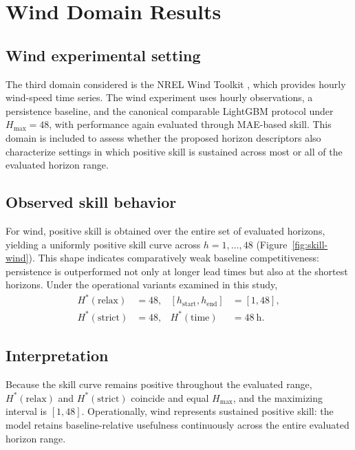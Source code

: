 \documentclass[pdflatex]{sn-jnl}
\begin{document}
\section{Wind Domain Results}

\subsection{Wind experimental setting}

The third domain considered is the NREL Wind Toolkit \citep{draxl2015}, which provides hourly wind-speed time series. The wind experiment uses hourly observations, a persistence baseline, and the canonical comparable LightGBM protocol under $H_{\max}=48$, with performance again evaluated through MAE-based skill. This domain is included to assess whether the proposed horizon descriptors also characterize settings in which positive skill is sustained across most or all of the evaluated horizon range.

\subsection{Observed skill behavior}
For wind, positive skill is obtained over the entire set of evaluated horizons, yielding a uniformly positive skill curve across $h=1,\dots,48$ (Figure~\ref{fig:skill-wind}). This shape indicates comparatively weak baseline competitiveness: persistence is outperformed not only at longer lead times but also at the shortest horizons.
Under the operational variants examined in this study,
\begin{equation}
\begin{aligned}
H^*(\mathrm{relax}) &= 48, & [h_{\mathrm{start}}, h_{\mathrm{end}}] &= [1,48],\\
H^*(\mathrm{strict}) &= 48, & H^*(\mathrm{time}) &= 48\ \mathrm{h}.
\end{aligned}
\end{equation}

\subsection{Interpretation}
Because the skill curve remains positive throughout the evaluated range, $H^*(\mathrm{relax})$ and $H^*(\mathrm{strict})$ coincide and equal $H_{\max}$, and the maximizing interval is $[1,48]$. Operationally, wind represents sustained positive skill: the model retains baseline-relative usefulness continuously across the entire evaluated horizon range.
\end{document}
